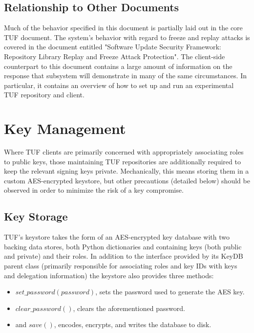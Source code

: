 \documentclass{article}
\begin{document}
\subsection{Relationship to Other Documents}
Much of the behavior specified in this document is partially laid out in the
core TUF document. The system's behavior with regard to freeze and replay
attacks is covered in the document entitled "Software Update Security Framework: 
Repository Library Replay and Freeze Attack Protection". The client-side counterpart
to this document contains a large amount of information on the response that
subsystem will demonstrate in many of the same circumstances. In particular, it
contains an overview of how to set up and run an experimental TUF repository and
client.
\section{Key Management}
Where TUF clients are primarily concerned with appropriately associating roles
to public keys, those maintaining TUF repositories are additionally required to
keep the relevant signing keys private. Mechanically, this means storing them in 
a custom AES-encrypted keystore, but other precautions (detailed below) should 
be observed in order to minimize the risk of a key compromise.

\subsection{Key Storage}
TUF's keystore takes the form of an AES-encrypted key database with two backing
data stores, both Python dictionaries and containing keys (both public and private)
and their roles. In addition to the interface provided by its KeyDB parent class
(primarily responsible for associating roles and key IDs with keys and delegation
information) the keystore also provides three methods:

\begin{itemize}
	\item $set\_password(password)$, sets the password used to generate the AES key.
	\item $clear\_password()$, clears the aforementioned password.
	\item and $save()$, encodes, encrypts, and writes the database to disk.
\end{itemize}
\end{document}
